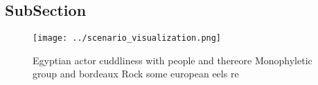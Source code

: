 \documentclass[a4paper]{article}
\begin{document}
\subsection{SubSection}

\begin{figure}
\centering
\texttt{[image: ../scenario\_visualization.png]}
\caption{Egyptian actor cuddliness with people and thereore Monophyletic group and bordeaux Rock some european eels re
}
\end{figure}
 
\end{document}
